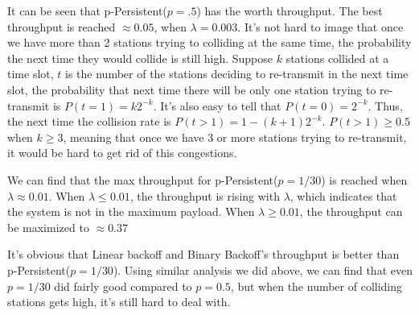 \documentclass{article}
\begin{document}
It can be seen that p-Persistent($p = .5$) has the worth throughput.
The best throughput is reached $\approx  0.05$, when $\lambda = 0.003$.
It's not hard to image that once we have more than 2 stations trying to colliding at the same time, the probability the next time they would collide is still high.
Suppose $k$ stations collided at a time slot, $t$ is the number of the stations deciding to re-transmit in the next time slot, the probability that next time there will be only one station trying to re-transmit is $P(t=1) = k2^{-k}$.
It's also easy to tell that $P(t=0) = 2^{-k}$.
Thus, the next time the collision rate is $P(t>1) = 1 - (k+1)2^{-k}$.
$P(t>1) \ge 0.5$ when $k \ge 3$, meaning that once we have 3 or more stations trying to re-transmit, it would be hard to get rid of this congestions.

\begin{figure}[H]
    \centering
\end{figure}


We can find that the max throughput for p-Persistent($p = 1/30$) is reached when $\lambda \approx 0.01$.
When $\lambda \le 0.01$, the throughput is rising with $\lambda$, which indicates that the system is not in the maximum payload.
When $\lambda \ge 0.01$, the throughput can be maximized to $\approx 0.37$

It's obvious that Linear backoff and Binary Backoff's throughput is better than p-Persistent($p = 1/30$).
Using similar analysis we did above, we can find that even $p = 1/30$ did fairly good compared to $p=0.5$, but when the number of colliding stations gets high, it's still hard to deal with.
\end{document}
